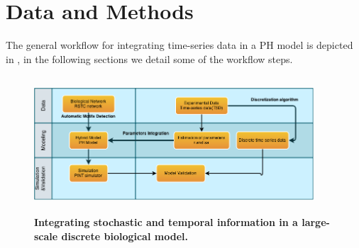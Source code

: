 
\section{Data and Methods}

The general workflow for integrating time-series data in a PH model is depicted in , in the following sections we 
detail some of the workflow steps.



\begin{figure}[!t]
 \centering
 \includegraphics[width=4.1in,height=2in]{images/workflow-2.png}
\caption{{\bf Integrating stochastic and temporal information in a large-scale discrete biological model.}} 
 \label{fig:workflow}
\end{figure}


